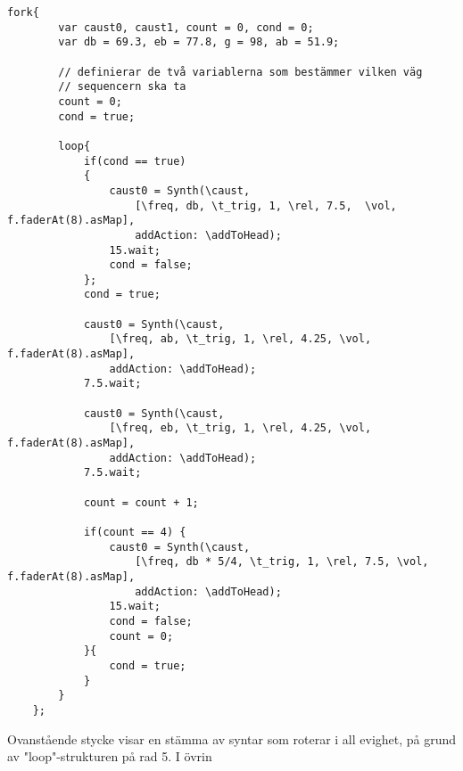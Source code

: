 \documentclass{article}
\begin{document}
	\begin{lstlisting}[style=SuperCollider-IDE, content=Sequencer-exempel]
	fork{
		var caust0, caust1, count = 0, cond = 0;
		var db = 69.3, eb = 77.8, g = 98, ab = 51.9;

		// definierar de två variablerna som bestämmer vilken väg 
		// sequencern ska ta
		count = 0;
		cond = true;

		loop{
			if(cond == true) 
			{
				caust0 = Synth(\caust, 
					[\freq, db, \t_trig, 1, \rel, 7.5,  \vol, f.faderAt(8).asMap], 
					addAction: \addToHead);
				15.wait;
				cond = false;
			};
			cond = true;

			caust0 = Synth(\caust, 
				[\freq, ab, \t_trig, 1, \rel, 4.25, \vol, f.faderAt(8).asMap],
				addAction: \addToHead); 
			7.5.wait;

			caust0 = Synth(\caust,
				[\freq, eb, \t_trig, 1, \rel, 4.25, \vol, f.faderAt(8).asMap],
				addAction: \addToHead); 
			7.5.wait;

			count = count + 1;

			if(count == 4) {
				caust0 = Synth(\caust, 
					[\freq, db * 5/4, \t_trig, 1, \rel, 7.5, \vol, f.faderAt(8).asMap],
					addAction: \addToHead); 
				15.wait;
				cond = false;
				count = 0;
			}{
				cond = true;
			}
		}
	};
	\end{lstlisting}

  Ovanstående stycke visar en stämma av syntar som roterar i all evighet, på grund av "loop"-strukturen på rad
  5. I övrin
  


  
\end{document}
